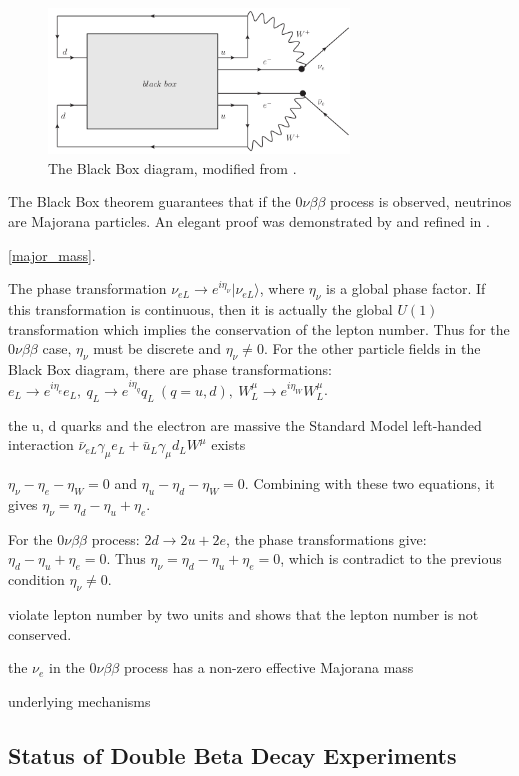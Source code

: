 \begin{figure}[htbp]
	\centering	
	\includegraphics[width=8cm]{blackbox.png}
	\caption{ The Black Box diagram, modified from \cite{schechter1982neutrinoless}.}
	\label{blackbox}
\end{figure}

The Black Box theorem guarantees that if the $0\nu\beta\beta$ process is observed, neutrinos are Majorana particles. An elegant proof was demonstrated by \cite{takasugi1984can} and refined in \cite{duerr2011quantitative,giunti2007fundamentals}. 

\ref{major_mass}.

The phase transformation $\nu_{eL}\to e^{i\eta_{\nu}}|\nu_{eL}\rangle$, where $\eta_\nu$ is a global phase factor.
If this transformation is continuous, then it is actually the global $U(1)$ transformation which implies the conservation of the lepton number. Thus for the $0\nu\beta\beta$ case, $\eta_\nu$ must be discrete and $\eta_\nu\neq 0$. For the other particle fields in the Black Box diagram, there are phase transformations: $e_L\to e^{i\eta_{e}}e_L,~q_L\to e^{i\eta_q}q_L~(q=u,d),~W^\mu_L\to e^{i\eta_W}W_L^\mu$.

the u, d quarks and the electron are massive
the Standard Model left-handed interaction $\bar{\nu}_{eL}\gamma_\mu e_L+\bar{u}_L\gamma_\mu d_L W^\mu$ exists


$\eta_\nu-\eta_e-\eta_W=0$ and $\eta_u-\eta_d-\eta_W=0$.
Combining with these two equations, it gives $\eta_\nu=\eta_d-\eta_u+\eta_e$.


For the $0\nu\beta\beta$ process: $2d\to2u+2e$, the phase transformations give: $\eta_d-\eta_u+\eta_e=0$. Thus $\eta_\nu=\eta_d-\eta_u+\eta_e=0$, which is contradict to the previous condition $\eta_\nu\neq 0$.


violate lepton number by two units and shows that the lepton number is not conserved.

the $\nu_e$ in the $0\nu\beta\beta$ process has a non-zero effective Majorana mass

underlying mechanisms 


\subsection{Status of Double Beta Decay Experiments}

